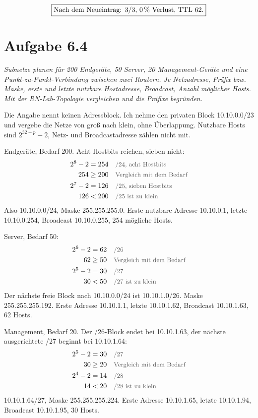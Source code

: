 \documentclass[a4paper,11pt]{article}
\newif\ifexplain
\newcommand{\aufgabe}[1]{\section*{Aufgabe #1}}
\newcommand{\angabe}[1]{{\raggedright\textit{#1}\par}\smallskip}
\newcommand{\why}[1]{\text{\small\color{black!65}#1}}
\newcommand{\explain}[1]{\ifexplain\begin{erklbox}#1\end{erklbox}\fi}
\begin{document}
\explain{Beide Richtungen müssen eine Route haben. Nur die Route auf r1 repariert den Hinweg. Die Antwort des Servers läuft über r2, und r2 braucht 10.0.1.0/24 via 10.0.12.1. Wer nur eine Seite setzt, sieht weiter Paketverlust, nur diesmal still, ohne die ICMP-Meldung von r1.}
\[\boxed{\text{Nach dem Neueintrag: 3/3, 0\,\% Verlust, TTL 62.}}\]

\aufgabe{6.4}
\angabe{Subnetze planen für 200 Endgeräte, 50 Server, 20 Management-Geräte und eine Punkt-zu-Punkt-Verbindung zwischen zwei Routern. Je Netzadresse, Präfix bzw. Maske, erste und letzte nutzbare Hostadresse, Broadcast, Anzahl möglicher Hosts. Mit der RN-Lab-Topologie vergleichen und die Präfixe begründen.}
Die Angabe nennt keinen Adressblock. Ich nehme den privaten Block 10.10.0.0/23 und vergebe die Netze von groß nach klein, ohne Überlappung. Nutzbare Hosts sind \(2^{32-p}-2\), Netz- und Broadcastadresse zählen nicht mit.

Endgeräte, Bedarf 200. Acht Hostbits reichen, sieben nicht:
\begin{align*}
2^{8}-2 &= 254 && \why{/24, acht Hostbits}\\
254 &\ge 200 && \why{Vergleich mit dem Bedarf}\\
2^{7}-2 &= 126 && \why{/25, sieben Hostbits}\\
126 &< 200 && \why{/25 ist zu klein}
\end{align*}
Also 10.10.0.0/24, Maske 255.255.255.0. Erste nutzbare Adresse 10.10.0.1, letzte 10.10.0.254, Broadcast 10.10.0.255, 254 mögliche Hosts.

Server, Bedarf 50:
\begin{align*}
2^{6}-2 &= 62 && \why{/26}\\
62 &\ge 50 && \why{Vergleich mit dem Bedarf}\\
2^{5}-2 &= 30 && \why{/27}\\
30 &< 50 && \why{/27 ist zu klein}
\end{align*}
Der nächste freie Block nach 10.10.0.0/24 ist 10.10.1.0/26. Maske 255.255.255.192. Erste Adresse 10.10.1.1, letzte 10.10.1.62, Broadcast 10.10.1.63, 62 Hosts.

Management, Bedarf 20. Der /26-Block endet bei 10.10.1.63, der nächste ausgerichtete /27 beginnt bei 10.10.1.64:
\begin{align*}
2^{5}-2 &= 30 && \why{/27}\\
30 &\ge 20 && \why{Vergleich mit dem Bedarf}\\
2^{4}-2 &= 14 && \why{/28}\\
14 &< 20 && \why{/28 ist zu klein}
\end{align*}
10.10.1.64/27, Maske 255.255.255.224. Erste Adresse 10.10.1.65, letzte 10.10.1.94, Broadcast 10.10.1.95, 30 Hosts.
\end{document}

